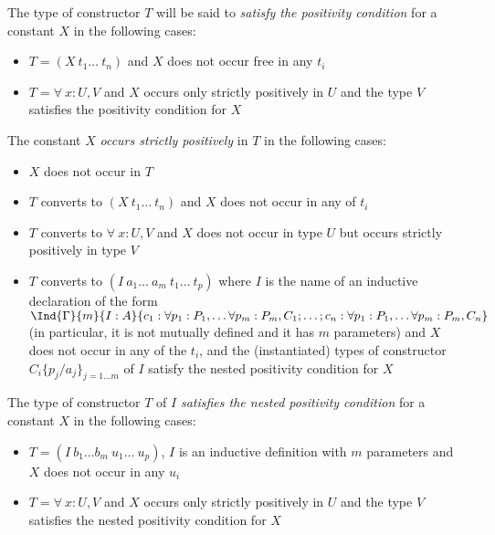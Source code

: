 \smallskip

The type of constructor $T$ will be said to {\em satisfy the positivity
condition} for a constant $X$ in the following cases:

\begin{itemize}
\item $T=(X~t_1\ldots ~t_n)$ and $X$ does not occur free in
any $t_i$
\item $T=\forall~x:U,V$ and $X$ occurs only strictly positively in $U$ and
the type $V$ satisfies the positivity condition for $X$
\end{itemize}

The constant $X$ {\em occurs strictly positively} in $T$ in the
following cases:

\begin{itemize}
\item $X$ does not occur in $T$
\item $T$ converts to $(X~t_1 \ldots ~t_n)$ and $X$ does not occur in
  any of $t_i$
\item $T$ converts to $\forall~x:U,V$ and $X$ does not occur in
  type $U$ but occurs strictly positively in type $V$
\item $T$ converts to $(I~a_1 \ldots ~a_m ~ t_1 \ldots ~t_p)$ where
  $I$ is the name of an inductive declaration of the form
  $\Ind{\Gamma}{m}{I:A}{c_1:\forall p_1:P_1,\ldots \forall
    p_m:P_m,C_1;\ldots;c_n:\forall p_1:P_1,\ldots \forall
    p_m:P_m,C_n}$ 
  (in particular, it is not mutually defined and it has $m$
  parameters) and $X$ does not occur in any of the $t_i$, and the
  (instantiated) types of constructor $C_i\{p_j/a_j\}_{j=1\ldots m}$
  of $I$ satisfy 
  the nested positivity condition for $X$
\end{itemize}

The type of constructor $T$ of $I$ {\em satisfies the nested
positivity condition} for a constant $X$ in the following
cases:

\begin{itemize}
\item $T=(I~b_1\ldots b_m~u_1\ldots ~u_{p})$, $I$ is an inductive
  definition with $m$ parameters and $X$ does not occur in
any $u_i$
\item $T=\forall~x:U,V$ and $X$ occurs only strictly positively in $U$ and
the type $V$ satisfies the nested positivity condition for $X$
\end{itemize}


